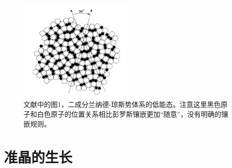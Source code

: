 \documentclass[hyperref, UTF8, a4paper]{ctexart}
\begin{document}
\begin{figure}
    \centering
    \includegraphics[width=0.5\textwidth]{10fold.PNG}
    \caption{文献\cite{PhysRevLett.58.706}中的图1，二成分兰纳德-琼斯势体系的低能态。注意这里黑色原子和白色原子的位置关系相比彭罗斯镶嵌更加“随意”，没有明确的镶嵌规则。}
    \label{fig:10fold}
\end{figure}

\section{准晶的生长}\label{sec:growth}
\end{document}
